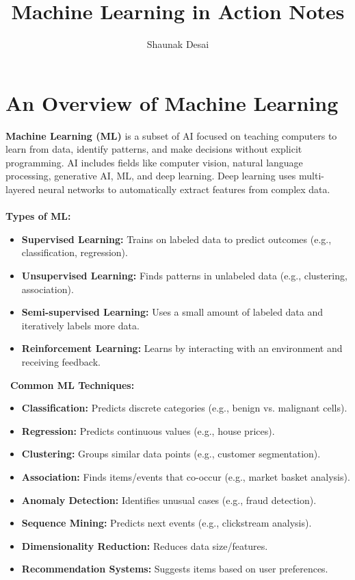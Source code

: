 \documentclass{article}
\title{Machine Learning in Action Notes}
\author{Shaunak Desai}
\date{}
\begin{document}
\maketitle
\section{An Overview of Machine Learning}

\textbf{Machine Learning (ML)} is a subset of AI focused on teaching computers to learn from data, identify patterns, and make decisions without explicit programming. AI includes fields like computer vision, natural language processing, generative AI, ML, and deep learning. Deep learning uses multi-layered neural networks to automatically extract features from complex data.
\\\\
\textbf{Types of ML:}
\begin{itemize}
    \item \textbf{Supervised Learning:} Trains on labeled data to predict outcomes (e.g., classification, regression).
    \item \textbf{Unsupervised Learning:} Finds patterns in unlabeled data (e.g., clustering, association).
    \item \textbf{Semi-supervised Learning:} Uses a small amount of labeled data and iteratively labels more data.
    \item \textbf{Reinforcement Learning:} Learns by interacting with an environment and receiving feedback.
\end{itemize}
\
\textbf{Common ML Techniques:}
\begin{itemize}
    \item \textbf{Classification:} Predicts discrete categories (e.g., benign vs. malignant cells).
    \item \textbf{Regression:} Predicts continuous values (e.g., house prices).
    \item \textbf{Clustering:} Groups similar data points (e.g., customer segmentation).
    \item \textbf{Association:} Finds items/events that co-occur (e.g., market basket analysis).
    \item \textbf{Anomaly Detection:} Identifies unusual cases (e.g., fraud detection).
    \item \textbf{Sequence Mining:} Predicts next events (e.g., clickstream analysis).
    \item \textbf{Dimensionality Reduction:} Reduces data size/features.
    \item \textbf{Recommendation Systems:} Suggests items based on user preferences.
\end{itemize}
\end{document}
